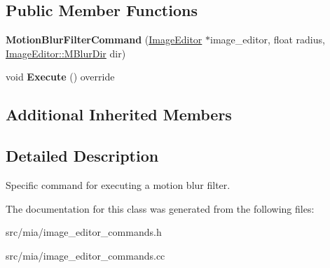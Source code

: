 \subsection*{Public Member Functions}
\begin{DoxyCompactItemize}
\item 
\mbox{\label{classimage__tools_1_1MotionBlurFilterCommand_a2a7024e58bd095b8b7f87f6987c7e11b}} 
{\bfseries Motion\+Blur\+Filter\+Command} (\hyperlink{classimage__tools_1_1ImageEditor}{Image\+Editor} $\ast$image\+\_\+editor, float radius, \hyperlink{classimage__tools_1_1ImageEditor_a20bacf2756f1b97eed82d2fee9628ac2}{Image\+Editor\+::\+M\+Blur\+Dir} dir)
\item 
\mbox{\label{classimage__tools_1_1MotionBlurFilterCommand_a1c267e42f069322158770d97a4bd8c18}} 
void {\bfseries Execute} () override
\end{DoxyCompactItemize}
\subsection*{Additional Inherited Members}


\subsection{Detailed Description}
Specific command for executing a motion blur filter. 

The documentation for this class was generated from the following files\+:\begin{DoxyCompactItemize}
\item 
src/mia/image\+\_\+editor\+\_\+commands.\+h\item 
src/mia/image\+\_\+editor\+\_\+commands.\+cc\end{DoxyCompactItemize}
